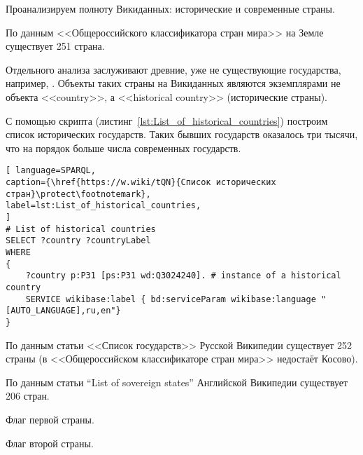 Проанализируем полноту Викиданных: исторические и современные страны.

По данным <<Общероссийского классификатора стран мира>>\autocite{oksm} на Земле существует 251 страна.

Отдельного анализа заслуживают древние, уже не существующие государства, например, . Объекты таких страны на Викиданных являются экземплярами не объекта <<country>>, а  <<historical country>> (исторические страны). 

С помощью скрипта (листинг~\ref{lst:List_of_historical_countries}) построим список исторических государств. Таких бывших государств оказалось три тысячи, что на порядок больше числа современных государств.

\begin{lstlisting}[ language=SPARQL, 
caption={\href{https://w.wiki/tQN}{Список исторических стран}\protect\footnotemark},
label=lst:List_of_historical_countries, 
]
# List of historical countries
SELECT ?country ?countryLabel
WHERE
{
	?country p:P31 [ps:P31 wd:Q3024240]. # instance of a historical country 
	SERVICE wikibase:label { bd:serviceParam wikibase:language "[AUTO_LANGUAGE],ru,en"} 
}
\end{lstlisting}



По данным статьи <<Список государств>>\autocite{list_of_sovereign_states} Русской Википедии существует 252 страны (в  <<Общероссийском классификаторе стран мира>> недостаёт Косово).

По данным статьи ``List of sovereign states''\autocite{list_of_sovereign_states_en} Английской Википедии существует 206 стран.

\begin{marginfigure}[0.0cm]
	{
		\setlength{\fboxsep}{0pt}%
		\setlength{\fboxrule}{1pt}%
	}
	\caption{Флаг первой страны.}%
	\label{fig:flag_kor}%
\end{marginfigure}
\begin{marginfigure}[0.0cm]
	{
		\setlength{\fboxsep}{0pt}%
		\setlength{\fboxrule}{1pt}%
	}
	\caption{Флаг второй страны.}%
	\label{fig:flag_singapore}%
\end{marginfigure}


